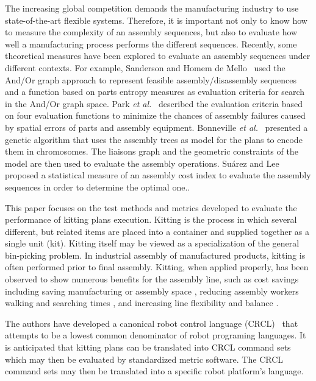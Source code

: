 The increasing global competition demands the manufacturing industry to use state-of-the-art flexible systems. Therefore, it is important not only to know how to measure the complexity of an assembly sequences, but also to evaluate how well a manufacturing process performs the different sequences. Recently, some theoretical measures have been explored to evaluate an assembly sequences under different contexts. For example, Sanderson and Homem de Mello~\cite{SANDERSON.1987} used the And/Or graph approach to represent feasible assembly/disassembly sequences and a function based on parts entropy measures as evaluation criteria for search in the And/Or graph space. Park \textit{et al.}~\cite{PARK.1991} described the evaluation criteria based on four evaluation functions to minimize the chances of assembly failures caused by spatial errors of parts and assembly equipment. Bonneville \textit{et al.}~\cite{BONNEVILLE.1995} presented a genetic algorithm that uses the assembly trees as model for the plans to encode them in chromosomes. The liaisons graph and the geometric constraints of the model are then used to evaluate the assembly operations. Su\'{a}rez and Lee~\cite{SUAREZ.1997} proposed a statistical measure of an assembly cost index to evaluate the assembly sequences in order to determine the optimal one..

This paper focuses on the test methods and metrics developed to evaluate the performance of kitting plans execution. Kitting is the process in which several different, but related items are placed into a container and supplied together as a single unit (kit). Kitting itself may be viewed as a specialization of the general bin-picking problem. In industrial assembly of manufactured products, kitting is often performed prior to final assembly. Kitting, when applied properly, has been observed to show numerous benefits for the assembly line, such as cost savings \cite{Carlsson_2008} including saving manufacturing or assembly space \cite{Medbo2003}, reducing assembly workers walking and searching times \cite{Schwind1992}, and increasing line flexibility \cite{Bozer1992} and balance \cite{Jiao2000}. 

The authors have developed a canonical robot control language (CRCL)~\cite{NISTIR.Balakirsky} that attempts to be a lowest common denominator of robot programing languages. It is anticipated that kitting plans can be translated into CRCL command sets which may then be evaluated by standardized metric software. The CRCL command sets may then be translated into a specific robot platform's language.





